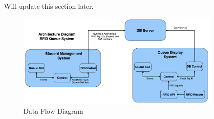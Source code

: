 \quad \quad Will update this section later.

\begin{figure}[h!]
	\centering
 	\includegraphics[width=0.9\textwidth]{images/ads_2}
 \caption{Data Flow Diagram}
\end{figure}
